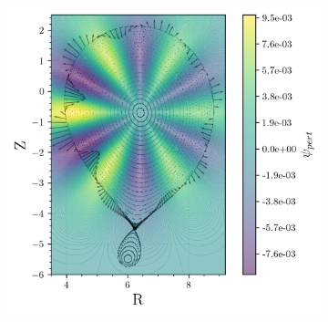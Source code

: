 \begin{figure}
    \centering
    \begin{subfigure}{0.57\textwidth}
        \centering
        \includegraphics[width=\textwidth]{images/toytok/perturbed-6-1/psi_pert.png}
        \caption{}
        \label{fig:toytok-61-psi}
    \end{subfigure}
    \hfill
    \begin{subfigure}{0.41\textwidth}
        \centering

\end{subfigure}
\end{figure}
